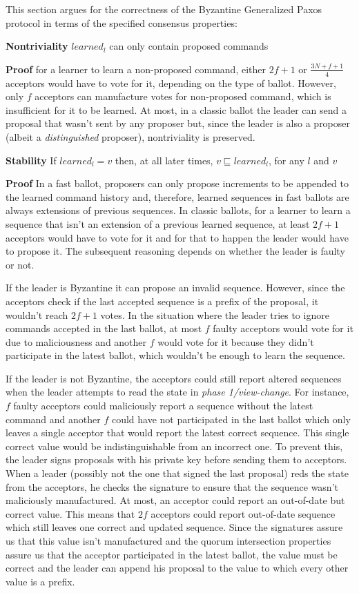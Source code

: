 This section argues for the correctness of the Byzantine Generalized Paxos protocol in terms of the specified consensus properties:\par

\textbf{Nontriviality} $learned_l$ can only contain proposed commands\par
\textbf{Proof} for a learner to learn a non-proposed command, either $2f+1$ or $\frac{3N+f+1}{4}$ acceptors would have to vote for it, depending on the type of ballot. However, only $f$ acceptors can manufacture votes for non-proposed command, which is insufficient for it to be learned. At most, in a classic ballot the leader can send a proposal that wasn't sent by any proposer but, since the leader is also a proposer (albeit a \textit{distinguished} proposer), nontriviality is preserved.\par

\textbf{Stability} If $learned_l = v$ then, at all later times, $v \sqsubseteq learned_l$, for any $l$ and $v$\par
\textbf{Proof} In a fast ballot, proposers can only propose increments to be appended to the learned command history and, therefore, learned sequences in fast ballots are always extensions of previous sequences. In classic ballots, for a learner to learn a sequence that isn't an extension of a previous learned sequence, at least $2f+1$ acceptors would have to vote for it and for that to happen the leader would have to propose it. The subsequent reasoning depends on whether the leader is faulty or not.\par
If the leader is Byzantine it can propose an invalid sequence. However, since the acceptors check if the last accepted sequence is a prefix of the proposal, it wouldn't reach $2f+1$ votes. In the situation where the leader tries to ignore commands accepted in the last ballot, at most $f$ faulty acceptors would vote for it due to maliciousness and another $f$ would vote for it because they didn't participate in the latest ballot, which wouldn't be enough to learn the sequence. \par
If the leader is not Byzantine, the acceptors could still report altered sequences when the leader attempts to read the state in \textit{phase 1/view-change}. For instance, $f$ faulty acceptors could maliciously report a sequence without the latest command and another $f$ could have not participated in the last ballot which only leaves a single acceptor that would report the latest correct sequence. This single correct value would be indistinguishable from an incorrect one. To prevent this, the leader signs proposals with his private key before sending them to acceptors. When a leader (possibly not the one that signed the last proposal) reds the state from the acceptors, he checks the signature to ensure that the sequence wasn't maliciously manufactured. At most, an acceptor could report an out-of-date but correct value. This means that $2f$ acceptors could report out-of-date sequence which still leaves one correct and updated sequence. Since the signatures assure us that this value isn't manufactured and the quorum intersection properties assure us that the acceptor participated in the latest ballot, the value must be correct and the leader can append his proposal to the value to which every other value is a prefix.